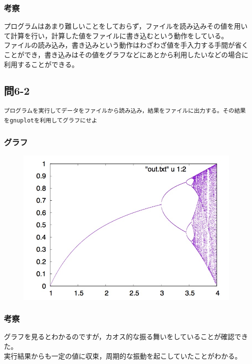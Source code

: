 \documentclass{jarticle}
\begin{document}
\subsubsection{考察\\}
プログラムはあまり難しいことをしておらず，ファイルを読み込みその値を用いて計算を行い，計算した値をファイルに書き込むという動作をしている。\\
ファイルの読み込み，書き込みという動作はわざわざ値を手入力する手間が省くことができ，書き込みはその値をグラフなどにあとから利用したいなどの場合に利用することができる。\\

\subsection{問6-2\\}
\begin{verbatim}
プログラムを実行してデータをファイルから読み込み，結果をファイルに出力する。その結果をgnuplotを利用してグラフにせよ
\end{verbatim}
\subsubsection{グラフ\\}
\begin{figure}[htb]
 \begin{center}
 \includegraphics[clip, width=15cm]{6-2.jpg} 
  \label{fig:level}
 \end{center}
\end{figure}
\subsubsection{考察\\}
グラフを見るとわかるのですが，カオス的な振る舞いをしていることが確認できた。\\
実行結果からも一定の値に収束，周期的な振動を起こしていたことがわかる。\\
\end{document}
